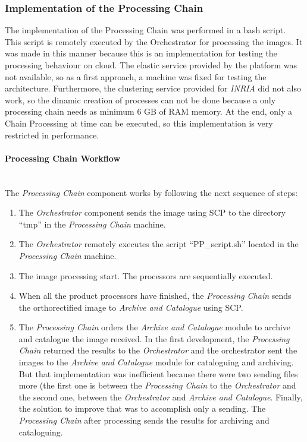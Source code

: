 \subsubsection{Implementation of the Processing Chain}

The implementation of the Processing Chain was performed in a bash script. This script is remotely executed by the Orchestrator for processing the
images. It was made in this manner because this is an implementation for testing the
processing behaviour on cloud. The elastic service provided by the \bonfire
platform was not available, so as a first approach, a machine was fixed for
testing the architecture. Furthermore, the clustering service provided for
\emph{INRIA} did not also work, so the dinamic creation of processes can not be
done because a only processing chain needs as minimum 6 GB of RAM memory. At the
end, only a Chain Processing at time can be executed, so this implementation is
very restricted in performance. 

\paragraph{Processing Chain Workflow}~\\

The \emph{Processing Chain} component works by following the next sequence of
steps:

\begin{enumerate}
\item The \emph{Orchestrator} component sends the image using \ac{SCP} to the
  directory ``tmp'' in the \emph{Processing Chain} machine.
\item The \emph{Orchestrator} remotely executes the script ``PP\_script.sh''
  located in the \emph{Processing Chain} machine.
\item The image processing start. The processors are sequentially executed.
\item When all the product processors have finished, the \emph{Processing Chain}
  sends the orthorectified image to \emph{Archive and Catalogue} using
  \ac{SCP}. 
\item The \emph{Processing Chain} orders the \emph{Archive and Catalogue} module
 to archive and catalogue the image received. In the first development, the
 \emph{Processing Chain} returned the results to the \emph{Orchestrator} and the
 orchestrator sent the images to the \emph{Archive and Catalogue} module for cataloguing
 and archiving. But that implementation was inefficient because there were two
 sending files more (the first one is between the \emph{Processing Chain} to the
 \emph{Orchestrator} and the second one, between the \emph{Orchestrator} and
 \emph{Archive and Catalogue}. Finally, the solution to improve that was to
 accomplish only a sending. The \emph{Processing Chain} after processing sends
 the results for archiving and cataloguing. 
\end{enumerate}

